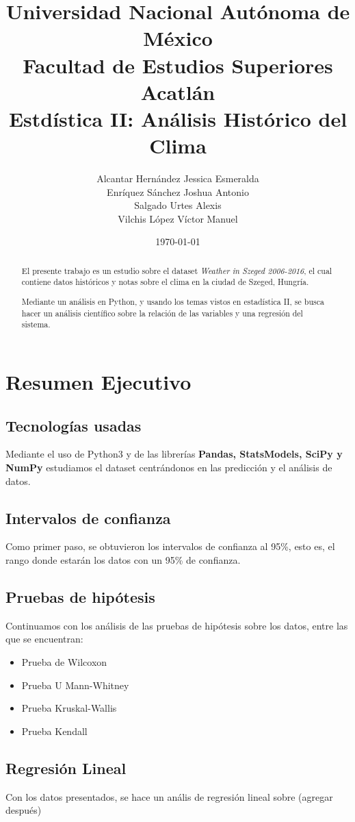 \documentclass[a4paper,10pt]{article}
\title{\textbf{Universidad Nacional Autónoma de México}\\ \textbf{Facultad de Estudios Superiores Acatlán}\\Estdística II: Análisis Histórico del Clima}
\date{\today}
\author{Alcantar Hernández Jessica Esmeralda\\Enríquez Sánchez Joshua Antonio\\Salgado Urtes Alexis\\Vilchis López Víctor Manuel}
\begin{document}
\maketitle
\newpage
\tableofcontents
\newpage

\begin{abstract}
    El presente trabajo es un estudio sobre el dataset \textit{Weather in Szeged 2006-2016}, el cual contiene datos históricos y notas sobre el clima en la ciudad de Szeged, Hungría.

    Mediante un análisis en Python, y usando los temas vistos en estadística II, se busca hacer un análisis científico sobre la relación de las variables y una regresión del sistema.
\end{abstract}
\newpage

\section{Resumen Ejecutivo}
\subsection{Tecnologías usadas}
Mediante el uso de Python3 y de las librerías \textbf{Pandas, StatsModels, SciPy y NumPy} estudiamos el dataset centrándonos en las predicción y el análisis de datos.

\subsection{Intervalos de confianza}
Como primer paso, se obtuvieron los intervalos de confianza al 95\%, esto es, el rango donde estarán los datos con un 95\% de confianza.

\subsection{Pruebas de hipótesis}
Continuamos con los análisis de las pruebas de hipótesis sobre los datos, entre las que se encuentran:
\begin{itemize}
 \item Prueba de Wilcoxon
 \item Prueba U Mann-Whitney
 \item Prueba Kruskal-Wallis
 \item Prueba Kendall
\end{itemize}
\subsection{Regresión Lineal}
Con los datos presentados, se hace un anális de regresión lineal sobre (agregar después)
\end{document}

